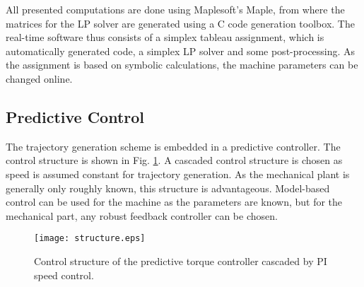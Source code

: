 \documentclass[a4paper,11pt,fleqn]{article}
\begin{document}
All presented computations are done using Maplesoft's Maple, from where the matrices for the LP solver are generated using a C code generation toolbox. The real-time software thus consists of a simplex tableau assignment, which is automatically generated code, a simplex LP solver and some post-processing. As the assignment is based on symbolic calculations, the machine parameters can be changed online.



\subsection*{Predictive Control}

The trajectory generation scheme is embedded in a predictive controller. The control structure is shown in Fig. \ref{fig:structure}. A cascaded control structure is chosen as speed is assumed constant for trajectory generation. As the mechanical plant is generally only roughly known, this structure is advantageous. Model-based control can be used for the machine as the parameters are known, but for the mechanical part, any robust feedback controller can be chosen.




\begin{figure}[!ht]
  \centering
  \texttt{[image: structure.eps]}
  \caption{Control structure of the predictive torque controller cascaded by PI speed control.\label{fig:structure}}
\end{figure}
\end{document}
